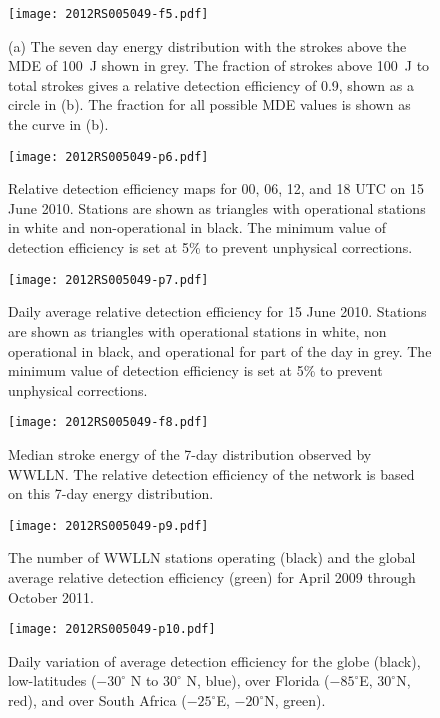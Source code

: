\documentclass[draft,ras]{agutex}
\begin{document}
\begin{figure}[ht!]
   \centering
\noindent\texttt{[image: 2012RS005049-f5.pdf]} 
   \caption{(a) The seven day energy distribution with the strokes above the MDE of 100~J shown in grey. The fraction of strokes above 100~J to total strokes gives a relative detection efficiency of 0.9, shown as a circle in (b). The fraction for all possible MDE values is shown as the curve in (b).}
   \label{Curve}
\end{figure}

\begin{figure}[ht!]
   \centering
\noindent\texttt{[image: 2012RS005049-p6.pdf]} 
   \caption{Relative detection efficiency maps for 00, 06, 12, and 18 UTC on 15 June 2010. Stations are shown as triangles with operational stations in white and non-operational in black. The minimum value of detection efficiency is set at 5\% to prevent unphysical corrections.}
   \label{Hour_Maps}
\end{figure}

\begin{figure}[ht!]
   \centering
\noindent\texttt{[image: 2012RS005049-p7.pdf]} 
   \caption{Daily average relative detection efficiency for 15 June 2010. Stations are shown as triangles with operational stations in white, non operational in black, and operational for part of the day in grey. The minimum value of detection efficiency is set at 5\% to prevent unphysical corrections.}
   \label{Daily_Map}
\end{figure}

\begin{figure}[ht!]
   \centering
\noindent\texttt{[image: 2012RS005049-f8.pdf]} 
   \caption{Median stroke energy of the 7-day distribution observed by WWLLN. The relative detection efficiency of the network is based on this 7-day energy distribution.}
   \label{MedianEnergy}
\end{figure}

\begin{figure}[ht!]
   \centering
\noindent\texttt{[image: 2012RS005049-p9.pdf]} 
   \caption{The number of WWLLN stations operating (black) and the global average relative detection efficiency (green) for April 2009 through October 2011.}
   \label{DE_Evolution}
\end{figure}

\begin{figure}[ht!]
   \centering
\noindent\texttt{[image: 2012RS005049-p10.pdf]} 
   \caption{Daily variation of average detection efficiency for the globe (black), low-latitudes ($-30^\circ$ N to $30^\circ$ N, blue), over Florida ($-85^\circ$E, $30^\circ$N, red), and over South Africa ($-25^\circ$E, $-20^\circ$N, green).}
   \label{deTrendLocal}
\end{figure}
\end{document}
